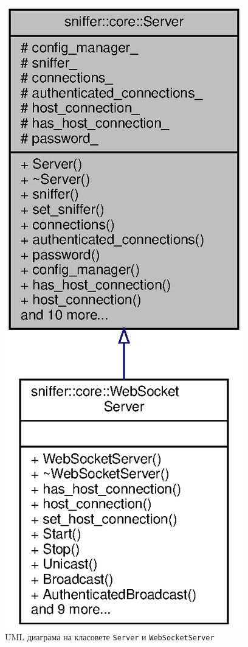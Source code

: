\documentclass[12pt,a4paper,oneside]{book}
\begin{document}
\begin{figure}[h!]
  \centering
  \includegraphics[scale=.7]{figures/server_websocketserver_uml.eps}
  \caption{UML диаграма на класовете \texttt{Server} и \texttt{WebSocketServer}}
  \label{server_websocketserver_uml_fig}
\end{figure}
\end{document}
